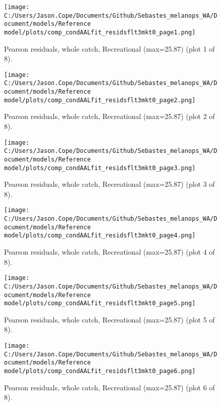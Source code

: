 \documentclass[11pt,
  english,
  letterpaper,
]{article}
\begin{document}
\begin{figure}
\centering
\texttt{[image: C:/Users/Jason.Cope/Documents/Github/Sebastes\_melanops\_WA/Document/models/Reference model/plots/comp\_condAALfit\_residsflt3mkt0\_page1.png]}
\caption{Pearson residuals, whole catch, Recreational (max=25.87) (plot 1 of 8).\label{fig:comp_condAALfit_residsflt3mkt0_page1}}
\end{figure}

\begin{figure}
\centering
\texttt{[image: C:/Users/Jason.Cope/Documents/Github/Sebastes\_melanops\_WA/Document/models/Reference model/plots/comp\_condAALfit\_residsflt3mkt0\_page2.png]}
\caption{Pearson residuals, whole catch, Recreational (max=25.87) (plot 2 of 8).\label{fig:comp_condAALfit_residsflt3mkt0_page2}}
\end{figure}

\begin{figure}
\centering
\texttt{[image: C:/Users/Jason.Cope/Documents/Github/Sebastes\_melanops\_WA/Document/models/Reference model/plots/comp\_condAALfit\_residsflt3mkt0\_page3.png]}
\caption{Pearson residuals, whole catch, Recreational (max=25.87) (plot 3 of 8).\label{fig:comp_condAALfit_residsflt3mkt0_page3}}
\end{figure}

\begin{figure}
\centering
\texttt{[image: C:/Users/Jason.Cope/Documents/Github/Sebastes\_melanops\_WA/Document/models/Reference model/plots/comp\_condAALfit\_residsflt3mkt0\_page4.png]}
\caption{Pearson residuals, whole catch, Recreational (max=25.87) (plot 4 of 8).\label{fig:comp_condAALfit_residsflt3mkt0_page4}}
\end{figure}

\begin{figure}
\centering
\texttt{[image: C:/Users/Jason.Cope/Documents/Github/Sebastes\_melanops\_WA/Document/models/Reference model/plots/comp\_condAALfit\_residsflt3mkt0\_page5.png]}
\caption{Pearson residuals, whole catch, Recreational (max=25.87) (plot 5 of 8).\label{fig:comp_condAALfit_residsflt3mkt0_page5}}
\end{figure}

\begin{figure}
\centering
\texttt{[image: C:/Users/Jason.Cope/Documents/Github/Sebastes\_melanops\_WA/Document/models/Reference model/plots/comp\_condAALfit\_residsflt3mkt0\_page6.png]}
\caption{Pearson residuals, whole catch, Recreational (max=25.87) (plot 6 of 8).\label{fig:comp_condAALfit_residsflt3mkt0_page6}}
\end{figure}
\end{document}
